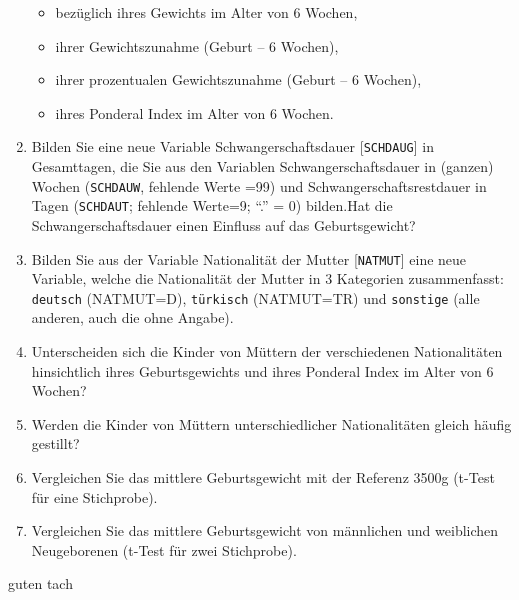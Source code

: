 \documentclass[
  letterpaper,
  DIV=11,
  numbers=noendperiod]{scrartcl}
\providecommand{\tightlist}{%
  \setlength{\itemsep}{0pt}\setlength{\parskip}{0pt}}\usepackage{longtable,booktabs,array}
\begin{document}
\begin{tcolorbox}[enhanced jigsaw, rightrule=.15mm, breakable, arc=.35mm, leftrule=.75mm, bottomrule=.15mm, colframe=quarto-callout-note-color-frame, colback=white, opacityback=0, left=2mm, toprule=.15mm]
\begin{enumerate}
  \begin{itemize}
  \tightlist
  \item
    bezüglich ihres Gewichts im Alter von 6 Wochen,
  \item
    ihrer Gewichtszunahme (Geburt -- 6 Wochen),
  \item
    ihrer prozentualen Gewichtszunahme (Geburt -- 6 Wochen),
  \item
    ihres Ponderal Index im Alter von 6 Wochen.
  \end{itemize}
\item
  Bilden Sie eine neue Variable Schwangerschaftsdauer
  {[}\texttt{SCHDAUG}{]} in Gesamttagen, die Sie aus den Variablen
  Schwangerschaftsdauer in (ganzen) Wochen (\texttt{SCHDAUW}, fehlende
  Werte =99) und Schwangerschaftsrestdauer in Tagen (\texttt{SCHDAUT};
  fehlende Werte=9; ``.'' = 0) bilden.\newline Hat die
  Schwangerschaftsdauer einen Einfluss auf das Geburtsgewicht?
\item
  Bilden Sie aus der Variable Nationalität der Mutter
  {[}\texttt{NATMUT}{]} eine neue Variable, welche die Nationalität der
  Mutter in 3 Kategorien zusammenfasst: \texttt{deutsch} (NATMUT=D),
  \texttt{türkisch} (NATMUT=TR) und \texttt{sonstige} (alle anderen,
  auch die ohne Angabe).
\item
  Unterscheiden sich die Kinder von Müttern der verschiedenen
  Nationalitäten hinsichtlich ihres Geburtsgewichts und ihres Ponderal
  Index im Alter von 6 Wochen?
\item
  Werden die Kinder von Müttern unterschiedlicher Nationalitäten gleich
  häufig gestillt?
\item
  Vergleichen Sie das mittlere Geburtsgewicht mit der Referenz 3500g
  (t-Test für eine Stichprobe).
\item
  Vergleichen Sie das mittlere Geburtsgewicht von männlichen und
  weiblichen Neugeborenen (t-Test für zwei Stichprobe).
\end{enumerate}

\end{tcolorbox}
      

guten tach
\end{document}
